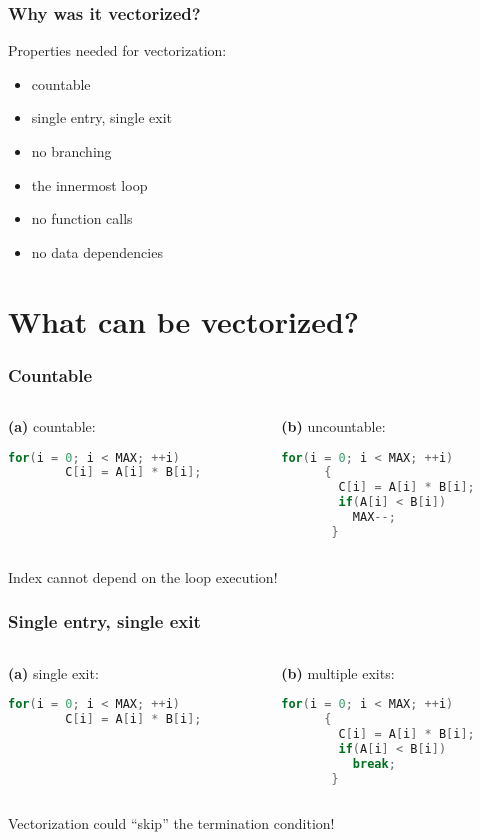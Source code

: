 \documentclass{beamer}
\begin{document}
\begin{frame}[fragile]
  \frametitle{Why was it vectorized?}
  Properties needed for vectorization:
  \begin{itemize}
   \item countable
   \item single entry, single exit
   \item no branching
   \item the innermost loop
   \item no function calls
   \item no data dependencies
  \end{itemize}
\end{frame}

\section{What can be vectorized?}

\begin{frame}[fragile]
  \frametitle{Countable}
    \begin{columns}[onlytextwidth]
      \begin{column}{0.5\textwidth}
	 \textbf{(a)} countable:
	 \begin{lstlisting}[language=C++]
	  for(i = 0; i < MAX; ++i) 
	    C[i] = A[i] * B[i];   
	\end{lstlisting}
      \end{column}
      \begin{column}{0.5\textwidth}
	\textbf{(b)} uncountable:
	\begin{lstlisting}[language=C++]
	  for(i = 0; i < MAX; ++i) 
	  {
	    C[i] = A[i] * B[i];
	    if(A[i] < B[i])
	      MAX--;
	   }
	\end{lstlisting}
      \end{column}
    \end{columns}
    
    Index cannot depend on the loop execution!   
\end{frame}

\begin{frame}[fragile]
  \frametitle{Single entry, single exit}
    \begin{columns}[onlytextwidth]
      \begin{column}{0.5\textwidth}
	 \textbf{(a)} single exit:
	 \begin{lstlisting}[language=C++]
	  for(i = 0; i < MAX; ++i) 
	    C[i] = A[i] * B[i];   
	\end{lstlisting}
      \end{column}
      \begin{column}{0.5\textwidth}
	\textbf{(b)} multiple exits:
	\begin{lstlisting}[language=C++]
	  for(i = 0; i < MAX; ++i) 
	  {
	    C[i] = A[i] * B[i];
	    if(A[i] < B[i])
	      break;
	   }
	\end{lstlisting}
      \end{column}
    \end{columns}
    
    Vectorization could ``skip'' the termination condition!
\end{frame}
\end{document}
